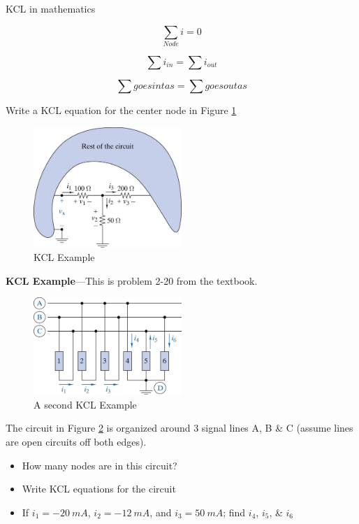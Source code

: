 \documentclass{handout}
\begin{document}
KCL in mathematics

\begin{equation}
\sum_{Node} i = 0
\end{equation}

\begin{equation}
\sum i_{in} = \sum i_{out}
\end{equation}

\begin{equation}
\sum goesintas = \sum goesoutas
\end{equation}

Write a KCL equation for the center node in Figure \ref{fig: KCL}
\begin{figure}[h b t]
\centering
\includegraphics[width=0.5\textwidth]{KCL.jpg}
\caption{KCL Example}
\label{fig: KCL}
\end{figure}



\newpage
\textbf{KCL Example}---This is problem 2-20 from the textbook.

\begin{figure}[h b t]
\centering
\includegraphics[width=0.5\textwidth]{KCL_Example.jpg}
\caption{A second KCL Example}
\label{fig: KCL_Example}
\end{figure}

The circuit in Figure \ref{fig: KCL_Example} is organized around 3 signal lines A, B \& C (assume lines are open circuits off both edges).
\begin{itemize}
\item How many nodes are in this circuit?
\item Write KCL equations for the circuit
\item If $i_1 = -20\ mA$, $i_2 = -12\ mA$, and $i_3 = 50\ mA$; find $i_4$, $i_5$, \& $i_6$
\end{itemize}
\end{document}
